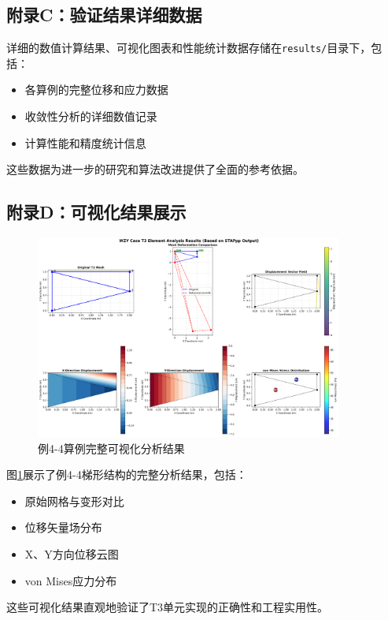 \documentclass[12pt,a4paper]{article}
\begin{document}
\subsection{附录C：验证结果详细数据}

详细的数值计算结果、可视化图表和性能统计数据存储在\texttt{results/}目录下，包括：

\begin{itemize}
    \item 各算例的完整位移和应力数据
    \item 收敛性分析的详细数值记录  
    \item 计算性能和精度统计信息
\end{itemize}

这些数据为进一步的研究和算法改进提供了全面的参考依据。

\subsection{附录D：可视化结果展示}

\begin{figure}[H]
\centering
\includegraphics[width=0.9\textwidth]{img/wzy_t3_analysis.png}
\caption{例4-4算例完整可视化分析结果}
\label{fig:wzy_complete_analysis}
\end{figure}

图\ref{fig:wzy_complete_analysis}展示了例4-4梯形结构的完整分析结果，包括：
\begin{itemize}
    \item 原始网格与变形对比
    \item 位移矢量场分布
    \item X、Y方向位移云图
    \item von Mises应力分布
\end{itemize}

这些可视化结果直观地验证了T3单元实现的正确性和工程实用性。
\end{document}
